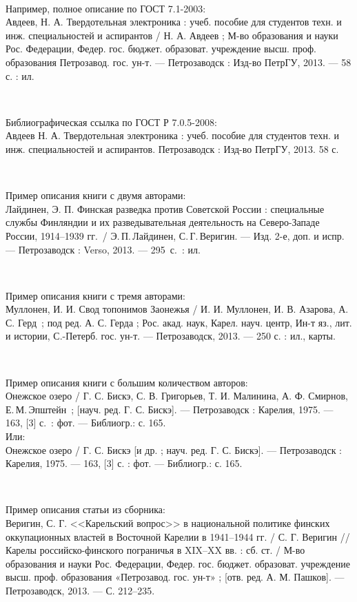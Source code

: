 \documentclass[utf8,14pt, coursreport]{G7-32}
\begin{document}
~

Например, полное описание по ГОСТ 7.1-2003:\\
Авдеев, Н. А. Твердотельная электроника : учеб. пособие для студентов техн. и
инж. специальностей и аспирантов / Н. А. Авдеев ; М-во образования и науки Рос. Федерации, Федер. гос. бюджет. образоват. учреждение высш. проф. образования
Петрозавод. гос. ун-т. --- Петрозаводск : Изд-во ПетрГУ, 2013. --- 58 с. : ил.

~

Библиографическая ссылка по ГОСТ Р 7.0.5-2008:\\
Авдеев Н. А. Твердотельная электроника : учеб. пособие для студентов техн. и
инж. специальностей и аспирантов. Петрозаводск : Изд-во ПетрГУ, 2013. 58 с.

~

Пример описания книги с двумя авторами:\\
Лайдинен, Э. П. Финская разведка против Советской России : специальные
службы Финляндии и их разведывательная деятельность на Северо-Западе России,
1914--1939 гг.~/ Э.\,П.\,Лайдинен, С.\,Г.\,Веригин. --- Изд. 2-е, доп. и испр. --- Петрозаводск : Verso, 2013. --- 295~с.~: ил.

~

Пример описания книги с тремя авторами:\\
Муллонен, И. И. Свод топонимов Заонежья / И. И. Муллонен, И. В. Азарова, А. С. Герд~; под ред. А. С. Герда ; Рос. акад. наук, Карел. науч. центр, Ин-т яз., лит. и истории, С.-Петерб. гос. ун-т. --- Петрозаводск, 2013. --- 250 с. : ил., карты.

~

Пример описания книги с большим количеством авторов:\\
Онежское озеро / Г. С. Бискэ, С. В. Григорьев, Т. И. Малинина, А. Ф. Смирнов, Е.\,М.\,Эп\-штейн~; [науч. ред. Г. С. Бискэ]. --- Петрозаводск : Карелия, 1975. --- 163, [3] с.~: фот. --- Библиогр.: с. 165.\\
Или:\\
Онежское озеро / Г. С. Бискэ [и др. ; науч. ред. Г. С. Бискэ]. --- Петрозаводск : Карелия, 1975. --- 163, [3] с. : фот. --- Библиогр.: с. 165.

~

Пример описания статьи из сборника:\\
Веригин, С. Г. <<Карельский вопрос>> в национальной политике финских оккупационных властей в Восточной Карелии в 1941--1944 гг. / С. Г. Веригин // Карелы российско-финского пограничья в XIX--XX вв. : сб. ст. / М-во образования и науки Рос. Федерации, Федер. гос. бюджет. образоват. учреждение высш. проф. образования «Петрозавод. гос. ун-т» ; [отв. ред. А. М. Пашков]. --- Петрозаводск, 2013. --- С. 212--235. 
\end{document}
